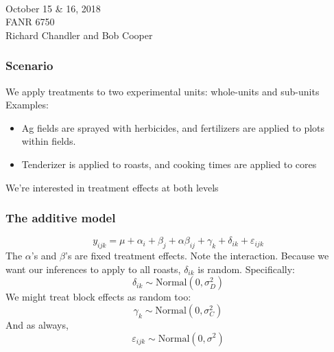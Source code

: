 \documentclass[color=usenames,dvipsnames]{beamer}\usepackage[]{graphicx}\usepackage[]{color}
\begin{document}
\setlength\fboxsep{0pt}



\begin{frame}[plain]
  \huge
  \centering \par
  {\color{RoyalBlue}{Lab 9 -- Split-plot Designs}} \\
  \vspace{1cm}
  \Large
  October 15 \& 16, 2018 \\
  FANR 6750 \\
  \vfill
  \large
  Richard Chandler and Bob Cooper
\end{frame}










\begin{frame}
  \frametitle{Scenario}
  \large
  We apply treatments to two experimental units: whole-units and
  sub-units
  \pause
  \vfill
  Examples:
  \begin{itemize}
    \large
    \item Ag fields are sprayed with herbicides, and fertilizers
      are applied to plots within fields.
    \item Tenderizer is applied to roasts, and cooking times are
      applied to cores
  \end{itemize}
  \pause
  \vfill
  We're interested in treatment effects at both levels
\end{frame}






\begin{frame}
  \frametitle{The additive model}
\[
y_{ijk} = \mu + \alpha_i + \beta_{j} + \alpha\beta_{ij} + \gamma_k +
\delta_{ik} + \varepsilon_{ijk}
\] %
The $\alpha$'s and $\beta$'s are fixed treatment effects. Note the interaction.
\pause
\vfill
Because we want our inferences to apply to all roasts,
$\delta_{ik}$ is random. Specifically:
\[
\delta_{ik} \sim \mbox{Normal}(0, \sigma^2_D)
\]
We might treat block effects as random too:
\[
\gamma_k \sim \mbox{Normal}(0, \sigma^2_C)
\]
\large
And as always,
\[
\varepsilon_{ijk} \sim \mbox{Normal}(0, \sigma^2)
\]
\end{frame}
\end{document}
